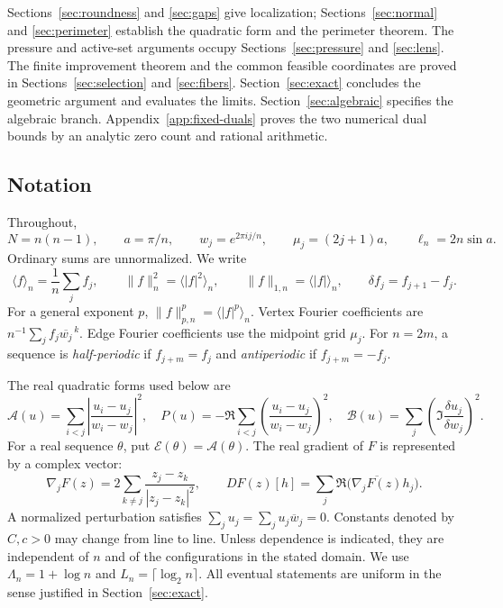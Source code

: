 \documentclass[11pt,reqno]{amsart}
\numberwithin{equation}{section}
\theoremstyle{definition}
\theoremstyle{remark}
\newcommand{\A}{\mathcal A}
\newcommand{\B}{\mathcal B}
\newcommand{\E}{\mathcal E}
\newcommand{\av}[1]{\langle #1\rangle_n}
\newcommand{\norm}[1]{\lVert #1\rVert}
\newcommand{\dd}{\delta}
\begin{document}
Sections~\ref{sec:roundness} and \ref{sec:gaps} give localization; Sections~\ref{sec:normal} and \ref{sec:perimeter} establish the quadratic form and the perimeter theorem. The pressure and active-set arguments occupy Sections~\ref{sec:pressure} and \ref{sec:lens}. The finite improvement theorem and the common feasible coordinates are proved in Sections~\ref{sec:selection} and \ref{sec:fibers}. Section~\ref{sec:exact} concludes the geometric argument and evaluates the limits. Section~\ref{sec:algebraic} specifies the algebraic branch. Appendix~\ref{app:fixed-duals} proves the two numerical dual bounds by an analytic zero count and rational arithmetic.

\subsection{Notation}
Throughout,
\[
 N=n(n-1),\qquad a=\pi/n,\qquad w_j=e^{2\pi ij/n},\qquad
 \mu_j=(2j+1)a,\qquad \ell_n=2n\sin a.
\]
Ordinary sums are unnormalized. We write
\[
 \av f=\frac1n\sum_jf_j,\qquad
 \norm f_n^2=\av{|f|^2},\qquad
 \norm f_{1,n}=\av{|f|},\qquad \dd f_j=f_{j+1}-f_j.
\]
For a general exponent $p$, $\norm f_{p,n}^p=\av{|f|^p}$. Vertex Fourier coefficients are $n^{-1}\sum_jf_j\overline{w_j}^{\,k}$. Edge Fourier coefficients use the midpoint grid $\mu_j$. For $n=2m$, a sequence is \emph{half-periodic} if $f_{j+m}=f_j$ and \emph{antiperiodic} if $f_{j+m}=-f_j$.

The real quadratic forms used below are
\begin{equation}\label{eq:quadratic-forms}
 \A(u)=\sum_{i<j}\left|\frac{u_i-u_j}{w_i-w_j}\right|^2,
 \quad P(u)=-\Re\sum_{i<j}\left(\frac{u_i-u_j}{w_i-w_j}\right)^2,
 \quad \B(u)=\sum_j\left(\Im\frac{\dd u_j}{\dd w_j}\right)^2.
\end{equation}
For a real sequence $\theta$, put $\E(\theta)=\A(\theta)$. The real gradient of $F$ is represented by a complex vector:
\[
 \nabla_jF(z)=2\sum_{k\ne j}\frac{z_j-z_k}{|z_j-z_k|^2},
 \qquad DF(z)[h]=\sum_j\Re\bigl(\overline{\nabla_jF(z)}h_j\bigr).
\]
A normalized perturbation satisfies $\sum_j u_j=\sum_j u_j\overline w_j=0$. Constants denoted by $C,c>0$ may change from line to line. Unless dependence is indicated, they are independent of $n$ and of the configurations in the stated domain. We use $\Lambda_n=1+\log n$ and $L_n=\lceil\log_2n\rceil$. All eventual statements are uniform in the sense justified in Section~\ref{sec:exact}.

\end{document}
